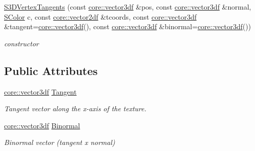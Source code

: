 \begin{DoxyCompactItemize}
\mbox{\label{structirr_1_1video_1_1S3DVertexTangents_a08be9afd37c99f7e95e762340f395eaa}} 
\hyperlink{structirr_1_1video_1_1S3DVertexTangents_a08be9afd37c99f7e95e762340f395eaa}{S3\+D\+Vertex\+Tangents} (const \hyperlink{namespaceirr_1_1core_a06f169d08b5c429f5575acb7edbad811}{core\+::vector3df} \&pos, const \hyperlink{namespaceirr_1_1core_a06f169d08b5c429f5575acb7edbad811}{core\+::vector3df} \&normal, \hyperlink{classirr_1_1video_1_1SColor}{S\+Color} c, const \hyperlink{namespaceirr_1_1core_a2cf08556d77f6f5a792973a6e27ed11b}{core\+::vector2df} \&tcoords, const \hyperlink{namespaceirr_1_1core_a06f169d08b5c429f5575acb7edbad811}{core\+::vector3df} \&tangent=\hyperlink{namespaceirr_1_1core_a06f169d08b5c429f5575acb7edbad811}{core\+::vector3df}(), const \hyperlink{namespaceirr_1_1core_a06f169d08b5c429f5575acb7edbad811}{core\+::vector3df} \&binormal=\hyperlink{namespaceirr_1_1core_a06f169d08b5c429f5575acb7edbad811}{core\+::vector3df}())
\begin{DoxyCompactList}\small\item\em constructor \end{DoxyCompactList}\end{DoxyCompactItemize}
\subsection*{Public Attributes}
\begin{DoxyCompactItemize}
\item 
\mbox{\label{structirr_1_1video_1_1S3DVertexTangents_a485fefe522b906ad5ba161e0a2c78250}} 
\hyperlink{namespaceirr_1_1core_a06f169d08b5c429f5575acb7edbad811}{core\+::vector3df} \hyperlink{structirr_1_1video_1_1S3DVertexTangents_a485fefe522b906ad5ba161e0a2c78250}{Tangent}
\begin{DoxyCompactList}\small\item\em Tangent vector along the x-\/axis of the texture. \end{DoxyCompactList}\item 
\mbox{\label{structirr_1_1video_1_1S3DVertexTangents_a1bbf1a06b343e7d477f6f31467d790ca}} 
\hyperlink{namespaceirr_1_1core_a06f169d08b5c429f5575acb7edbad811}{core\+::vector3df} \hyperlink{structirr_1_1video_1_1S3DVertexTangents_a1bbf1a06b343e7d477f6f31467d790ca}{Binormal}
\begin{DoxyCompactList}\small\item\em Binormal vector (tangent x normal) \end{DoxyCompactList}\end{DoxyCompactItemize}


